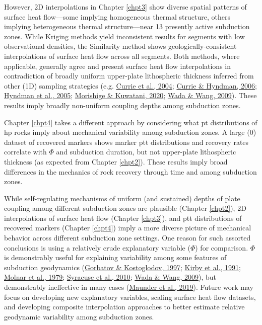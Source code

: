 However, 2D interpolations in Chapter \ref{chpt3} show diverse spatial patterns of surface heat flow---some implying homogeneous thermal structure, others implying heterogeneous thermal structure---near 13 presently active subduction zones. While Kriging methods yield inconsistent results for segments with low observational densities, the Similarity method shows geologically-consistent interpolations of surface heat flow across all segments. Both methods, where applicable, generally agree and present surface heat flow interpolations in contradiction of broadly uniform upper-plate lithospheric thickness inferred from other (1D) sampling strategies (e.g. \protect\hyperlink{ref-currie2004}{Currie et al., 2004}; \protect\hyperlink{ref-currie2006}{Currie \& Hyndman, 2006}; \protect\hyperlink{ref-hyndman2005}{Hyndman et al., 2005}; \protect\hyperlink{ref-morishige2020}{Morishige \& Kuwatani, 2020}; \protect\hyperlink{ref-wada2009}{Wada \& Wang, 2009}). These results imply broadly non-uniform coupling depths among subduction zones.

Chapter \ref{chpt4} takes a different approach by considering what \gls{pt} distributions of \gls{hp} rocks imply about mechanical variability among subduction zones. A large (0) dataset of recovered markers shows marker \gls{ptt} distributions and recovery rates correlate with \(\Phi\) and subduction duration, but not upper-plate lithospheric thickness (as expected from Chapter \ref{chpt2}). These results imply broad differences in the mechanics of rock recovery through time and among subduction zones.

While self-regulating mechanisms of uniform (and sustained) depths of plate coupling among different subduction zones are plausible (Chapter \ref{chpt2}), 2D interpolations of surface heat flow (Chapter \ref{chpt3}), and \gls{ptt} distributions of recovered markers (Chapter \ref{chpt4}) imply a more diverse picture of mechanical behavior across different subduction zone settings. One reason for such assorted conclusions is using a relatively crude explanatory variable (\(\Phi\)) for comparison. \(\Phi\) is demonstrably useful for explaining variability among some features of subduction geodynamics (\protect\hyperlink{ref-gorbatov1997}{Gorbatov \& Kostoglodov, 1997}; \protect\hyperlink{ref-kirby1991}{Kirby et al., 1991}; \protect\hyperlink{ref-molnar1979}{Molnar et al., 1979}; \protect\hyperlink{ref-syracuse2010}{Syracuse et al., 2010}; \protect\hyperlink{ref-wada2009}{Wada \& Wang, 2009}), but demonstrably ineffective in many cases (\protect\hyperlink{ref-maunder2019}{Maunder et al., 2019}). Future work may focus on developing new explanatory variables, scaling surface heat flow datasets, and developing composite interpolation approaches to better estimate relative geodynamic variability among subduction zones.

